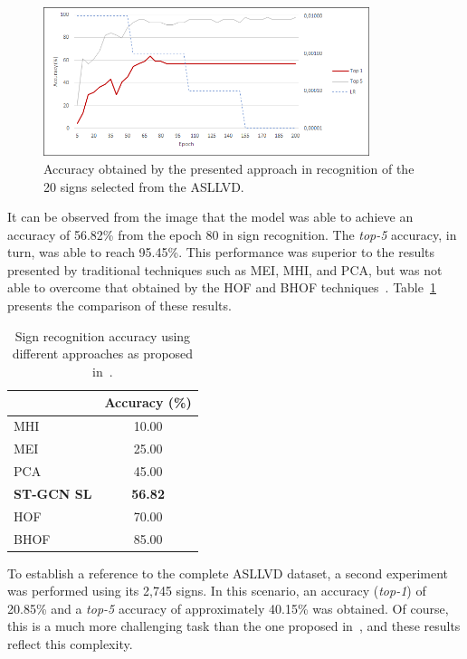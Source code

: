 \begin{figure}[!t]
    \centering
    \includegraphics[width=0.85\textwidth]{images/results_20}
    \caption{Accuracy obtained by the presented approach in recognition of the 20 signs selected from the ASLLVD.}
    \label{fig:training-asllvd-20}
\end{figure}

It can be observed from the image that the model was able to achieve an accuracy of 56.82\% from the epoch 80 in sign recognition. The \textit{top-5} accuracy, in turn, was able to reach 95.45\%. This performance was superior to the results presented by traditional techniques such as MEI, MHI, and PCA, but was not able to overcome that obtained by the HOF and BHOF techniques~\cite{lim-2016}. Table~\ref{tab:results-comparison-20} presents the comparison of these results.

\begin{table}[ht]
\centering
\caption{Sign recognition accuracy using different approaches as proposed in~\cite{lim-2016}.}
\label{tab:results-comparison-20}
\begin{tabular}{lc}
\hline
                   & Accuracy (\%)  \\ \hline
MHI                & 10.00                     \\
MEI                & 25.00                     \\
PCA                & 45.00                     \\
\textbf{ST-GCN SL} & \textbf{56.82}            \\
HOF                & 70.00                     \\
BHOF               & 85.00                     \\ \hline
\end{tabular}
\end{table}


To establish a reference to the complete ASLLVD dataset, a second experiment was performed using its 2,745 signs. In this scenario, an accuracy (\textit{top-1}) of 20.85\% and a \textit{top-5} accuracy of approximately 40.15\% was obtained. Of course, this is a much more challenging task than the one proposed in~\cite{lim-2016}, and these results reflect this complexity.

